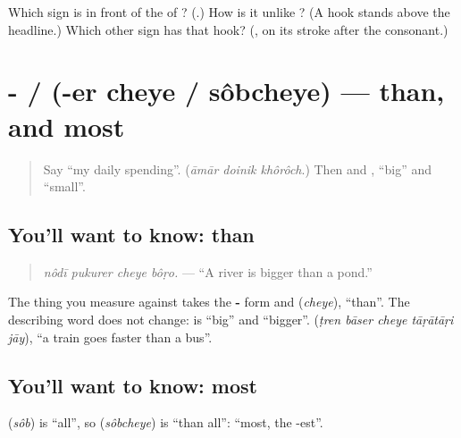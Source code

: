 \begin{tcolorbox}[breakable,colback=teal!4,colframe=teal!35!black,title={Before you move on}]
Which sign is in front of the \textbf{} of \textbf{}? (\textbf{}.) How is it unlike \textbf{}? (A hook stands above the headline.) Which other sign has that hook? (\textbf{}, on its stroke after the consonant.)
\end{tcolorbox}
\section[\texorpdfstring{-\bn{এর} \bn{চেয়ে} / \bn{সবচেয়ে} (-er cheye / sôbcheye)}{-এর চেয়ে / সবচেয়ে (-er cheye / sôbcheye)}]{-  /  (-er cheye / sôbcheye) — than, and most}

\label{lesson:BN-C273-cheye}



\begin{quote}
Say \textquotedblleft{}my daily spending\textquotedblright{}. (\emph{āmār doinik khôrôch}.) Then \textbf{} and \textbf{}, \textquotedblleft{}big\textquotedblright{} and \textquotedblleft{}small\textquotedblright{}.
\end{quote}

\subsection*{You'll want to know: than}
\begin{quote}
\textbf{   }
\end{quote}

\begin{quote}
\emph{nôdī pukurer cheye bôṛo.} — \textquotedblleft{}A river is bigger than a pond.\textquotedblright{}
\end{quote}

The thing you measure against takes the \textbf{-} form and \textbf{} (\emph{cheye}), \textquotedblleft{}than\textquotedblright{}. The describing word does not change: \textbf{} is \textquotedblleft{}big\textquotedblright{} and \textquotedblleft{}bigger\textquotedblright{}. \textbf{    } (\emph{ṭren bāser cheye tāṛātāṛi jāy}), \textquotedblleft{}a train goes faster than a bus\textquotedblright{}.

\subsection*{You'll want to know: most}
\textbf{} (\emph{sôb}) is \textquotedblleft{}all\textquotedblright{}, so \textbf{} (\emph{sôbcheye}) is \textquotedblleft{}than all\textquotedblright{}: \textquotedblleft{}most, the -est\textquotedblright{}.

